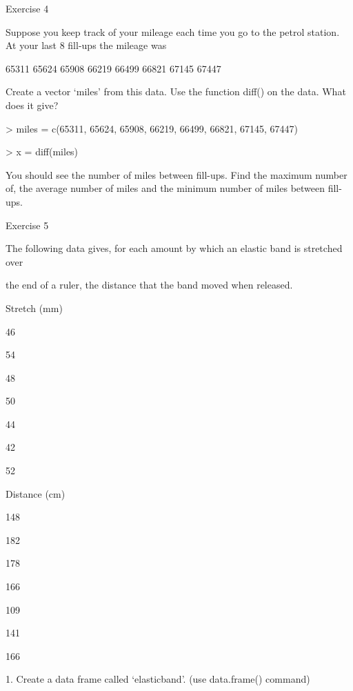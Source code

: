  

Exercise 4

 

Suppose you keep track of your mileage each time you go to the petrol station. At your last 8 fill-ups the mileage was

 

65311 65624 65908 66219 66499 66821 67145 67447

 

 Create a vector ‘miles’ from this data. Use the function diff() on the data. What does it give?

 

> miles = c(65311, 65624, 65908, 66219, 66499, 66821, 67145, 67447)

> x = diff(miles)

 

You should see the number of miles between fill-ups. Find the maximum number of, the average number of miles and the minimum number of miles between fill-ups.

 

Exercise 5

 

The following data gives, for each amount by which an elastic band is stretched over

the end of a ruler, the distance that the band moved when released.

 














Stretch (mm)
 

46
 

54
 

48
 

50
 

44
 

42
 

52
 



Distance (cm)
 

148
 

182
 

178
 

166
 

109
 

141
 

166
 

 
1.
Create a data frame called ‘elasticband’. (use data.frame() command)

